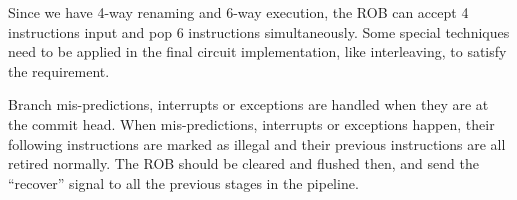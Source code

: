 Since we have 4-way renaming and 6-way execution, the ROB can accept 4 instructions input and pop 6 instructions simultaneously. Some special techniques need to be applied in the final circuit implementation, like interleaving, to satisfy the requirement.

Branch mis-predictions, interrupts or exceptions are handled when they are at the commit head. When mis-predictions, interrupts or exceptions happen, their following instructions are marked as illegal and their previous instructions are all retired normally. The ROB should be cleared and flushed then, and send the ``recover'' signal to all the previous stages in the pipeline.
